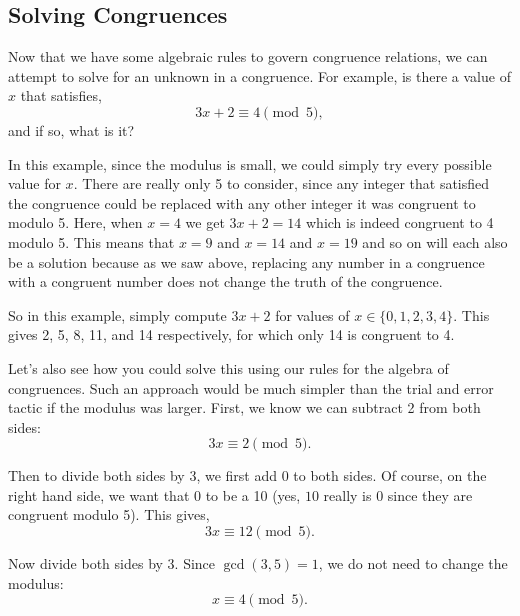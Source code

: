 \documentclass[10pt,]{book}
\theoremstyle{plain}
\theoremstyle{definition}
\theoremstyle{definition}
\theoremstyle{definition}
\numberwithin{equation}{chapter}
\begin{document}
\subsection[Solving Congruences]{Solving Congruences}\label{subsection-49}

Now that we have some algebraic rules to govern congruence relations, we can attempt to solve for an unknown in a congruence. For example, is there a value of \(x\) that satisfies,
\begin{equation*}
  3x + 2 \equiv 4 \pmod{5},
\end{equation*}
and if so, what is it?
%
\par

In this example, since the modulus is small, we could simply try every possible value for \(x\). There are really only 5 to consider, since any integer that satisfied the congruence could be replaced with any other integer it was congruent to modulo 5. Here, when \(x = 4\) we get \(3x + 2 = 14\) which is indeed congruent to 4 modulo 5. This means that \(x = 9\) and \(x = 14\) and \(x = 19\) and so on will each also be a solution because as we saw above, replacing any number in a congruence with a congruent number does not change the truth of the congruence.
%
\par

So in this example, simply compute \(3x + 2\) for values of \(x \in \{0,1,2,3,4\}\). This gives 2, 5, 8, 11, and 14 respectively, for which only 14 is congruent to 4.
%
\par

Let's also see how you could solve this using our rules for the algebra of congruences. Such an approach would be much simpler than the trial and error tactic if the modulus was larger. First, we know we can subtract 2 from both sides:
\begin{equation*}
  3x \equiv 2 \pmod{5}.
\end{equation*}
%
\par

Then to divide both sides by 3, we first add 0 to both sides. Of course, on the right hand side, we want that 0 to be a 10 (yes, \(10\) really is 0 since they are congruent modulo 5). This gives,
\begin{equation*}
  3x \equiv 12 \pmod{5}.
\end{equation*}
%
\par

Now divide both sides by 3. Since \(\gcd(3,5) = 1\), we do not need to change the modulus:
\begin{equation*}
  x \equiv 4 \pmod{5}.
\end{equation*}
%
\par
\end{document}
